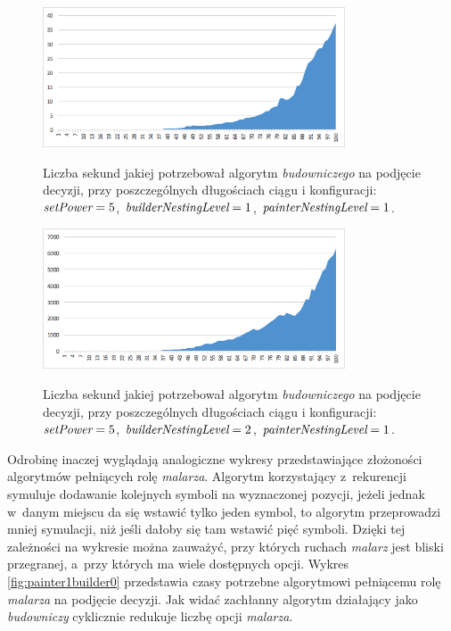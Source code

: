 \documentclass[document]{xmgr}
\begin{document}
\begin{figure}[tbh]
    \centering
    \caption{Liczba sekund jakiej potrzebował algorytm \emph{budowniczego} na podjęcie decyzji, przy poszczególnych długościach ciągu i konfiguracji: $\emph{setPower}=5$, $\emph{builderNestingLevel}=1$, $\emph{painterNestingLevel}=1$.}
    \includegraphics[width = 0.8\textwidth]{images/timeBuilder1Painter1}
    \label{fig:builder1painter1}
\end{figure}

\begin{figure}[tbh]
    \centering
    \caption{Liczba sekund jakiej potrzebował algorytm \emph{budowniczego} na podjęcie decyzji, przy poszczególnych długościach ciągu i konfiguracji: $\emph{setPower}=5$, $\emph{builderNestingLevel}=2$, $\emph{painterNestingLevel}=1$.}
    \includegraphics[width = 0.8\textwidth]{images/timeBuilder2Painter1}
    \label{fig:builder2painter1}
\end{figure}



Odrobinę inaczej wyglądają analogiczne wykresy przedstawiające złożoności algorytmów pełniących rolę \emph{malarza}. Algorytm korzystający z~rekurencji symuluje dodawanie kolejnych symboli na wyznaczonej pozycji, jeżeli jednak w~danym miejscu da się wstawić tylko jeden symbol, to algorytm przeprowadzi mniej symulacji, niż jeśli dałoby się tam wstawić pięć symboli. Dzięki tej zależności na wykresie można zauważyć, przy których ruchach \emph{malarz} jest bliski przegranej, a~przy których ma wiele dostępnych opcji. Wykres \ref{fig:painter1builder0} przedstawia czasy potrzebne algorytmowi pełniącemu rolę \emph{malarza} na podjęcie decyzji. Jak widać zachłanny algorytm działający jako \emph{budowniczy} cyklicznie redukuje liczbę opcji \emph{malarza}.
\end{document}
